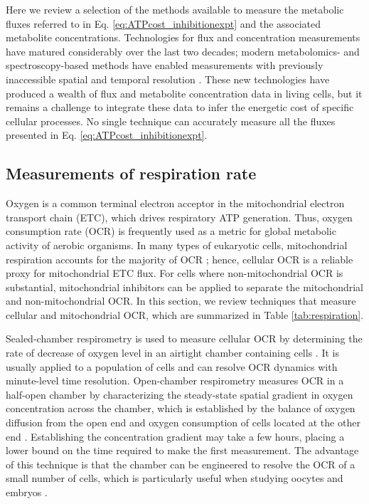 \documentclass{compactarticle}
\begin{document}
Here we review a selection of the methods available to measure the metabolic fluxes referred to in Eq. \ref{eq:ATPcost_inhibitionexpt} and the associated metabolite concentrations. Technologies for flux and concentration measurements have matured considerably over the last two decades; modern metabolomics- and spectroscopy-based methods have enabled measurements with previously inaccessible spatial and temporal resolution \cite{law2022integrative}. These new technologies have produced a wealth of flux and metabolite concentration data in living cells, but it remains a challenge to integrate these data to infer the energetic cost of specific cellular processes. No single technique can accurately measure all the fluxes presented in Eq. \ref{eq:ATPcost_inhibitionexpt}.

\subsection{Measurements of respiration rate}
Oxygen is a common terminal electron acceptor in the mitochondrial electron transport chain (ETC), which drives respiratory ATP generation. Thus, oxygen consumption rate (OCR) is frequently used as a metric for global metabolic activity of aerobic organisms. In many types of eukaryotic cells, mitochondrial respiration accounts for the majority of OCR \cite{brand2011assessing}; hence, cellular OCR is a reliable proxy for mitochondrial ETC flux. For cells where non-mitochondrial OCR is substantial, mitochondrial inhibitors can be applied to separate the mitochondrial and non-mitochondrial OCR. In this section, we review techniques that measure cellular and mitochondrial OCR, which are summarized in Table \ref{tab:respiration}. 

Sealed-chamber respirometry is used to measure cellular OCR by determining the rate of decrease of oxygen level in an airtight chamber containing cells \cite{houghton1996,ferrick2008,gnaiger2000}. It is usually applied to a population of cells and can resolve OCR dynamics with minute-level time resolution. Open-chamber respirometry measures OCR in a half-open chamber by characterizing the steady-state spatial gradient in oxygen concentration across the chamber, which is established by the balance of oxygen diffusion from the open end and oxygen consumption of cells located at the other end \cite{lopez2005}. Establishing the concentration gradient may take a few hours, placing a lower bound on the time required to make the first measurement. The advantage of this technique is that the chamber can be engineered to resolve the OCR of a small number of cells, which is particularly useful when studying oocytes and embryos \cite{lopez2005}. 
\end{document}
